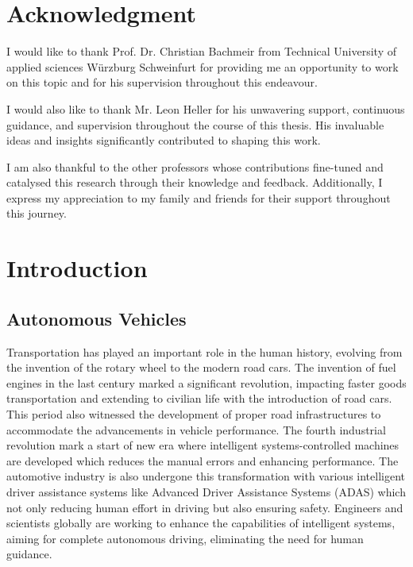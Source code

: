 \documentclass[12pt,twoside,a4paper,parskip]{scrbook} %
\begin{document}


\newpage
\chapter*{Acknowledgment}
I would like to thank Prof. Dr. Christian Bachmeir from Technical University of applied sciences Würzburg Schweinfurt for providing me an opportunity to work on this topic and for his supervision throughout this endeavour.

I would also like to thank Mr. Leon Heller for his unwavering support, continuous guidance, and supervision throughout the course of this thesis. His invaluable ideas and insights significantly contributed to shaping this work.

I am also thankful to the other professors whose contributions fine-tuned and catalysed this research through their knowledge and feedback. Additionally, I express my appreciation to my family and friends for their support throughout this journey.

\tableofcontents
\mainmatter

\chapter{Introduction}\label{ch:intro}
\section{Autonomous Vehicles}
Transportation has played an important role in the human history, evolving from the invention of the rotary wheel to the modern road cars. The invention of fuel engines in the last century marked a significant revolution, impacting faster goods transportation and extending to civilian life with the introduction of road cars. This period also witnessed the development of proper road infrastructures to accommodate the advancements in vehicle performance. The fourth industrial revolution mark a start of new era where intelligent systems-controlled machines are developed which reduces the manual errors and enhancing performance. The automotive industry is also undergone this transformation with various intelligent driver assistance systems like Advanced Driver Assistance Systems (ADAS) which not only reducing human effort in driving but also ensuring safety. Engineers and scientists globally are working to enhance the capabilities of intelligent systems, aiming for complete autonomous driving, eliminating the need for human guidance. 
\end{document}
